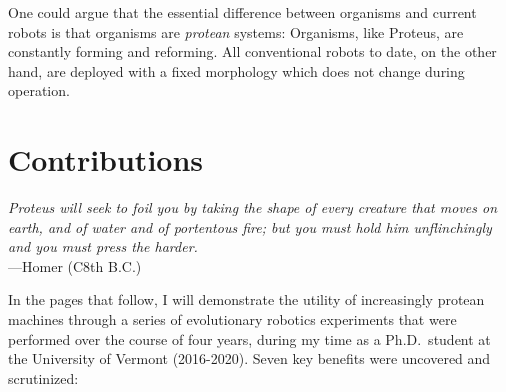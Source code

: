One could argue that the essential difference between organisms and current robots is that organisms are \textit{protean} systems:
Organisms, like Proteus,
are constantly forming and reforming.
All conventional robots to date, on the other hand, are deployed with a fixed morphology which does not change during operation.



\section{Contributions}
\label{sec:contributions}


\begin{changemargin}{4em}{4em} 

\vspace{1em}

    \textit{Proteus will seek to foil you by taking the shape of every creature that moves on earth, and of water and of portentous fire; but you must hold him unflinchingly and you must press the harder.} \\[4pt]
    \hspace*{16.5em} ---Homer (C8th B.C.) 
    
\vspace{1em}
    
    
\end{changemargin}

\noindent
In the pages that follow, I will demonstrate the utility of increasingly protean machines through a series of evolutionary robotics experiments that were performed over the course of four years, during my time as a Ph.D.~student at the University of Vermont \mbox{(2016-2020)}.
Seven key benefits were uncovered and scrutinized:

